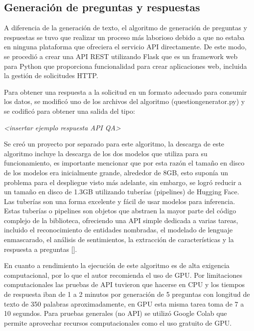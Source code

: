 \documentclass[../Main.tex]{subfiles}
\begin{document}
        \subsection{Generación de preguntas y respuestas}
            \begin{justify}
            A diferencia de la generación de texto, el algoritmo de generación de preguntas y respuestas se tuvo que realizar un proceso más laborioso debido a que no estaba en ninguna plataforma que ofreciera el servicio API directamente. De este modo, se procedió a crear una API REST utilizando Flask que es un framework web para Python que proporciona funcionalidad para crear aplicaciones web, incluida la gestión de solicitudes HTTP.
            
            Para obtener una respuesta a la solicitud en un formato adecuado para consumir los datos, se modificó uno de los archivos del algoritmo (questiongenerator.py) y se codificó para obtener una salida del tipo:
            
            \begin{center}
            \textit{<insertar ejemplo respuesta API QA>}
            \end{center}
            
            Se creó un proyecto por separado para este algoritmo, la descarga de este algoritmo incluye la descarga de los dos modelos que utiliza para su funcionamiento, es importante mencionar que por esta razón el tamaño en disco de los modelos era inicialmente grande, alrededor de 8GB, esto suponía un problema para el despliegue visto más adelante, sin embargo, se logró reducir a un tamaño en disco de 1.3GB utilizando tuberías (pipelines) de Hugging Face. Las tuberías son una forma excelente y fácil de usar modelos para inferencia. Estas tuberías o pipelines son objetos que abstraen la mayor parte del código complejo de la biblioteca, ofreciendo una API simple dedicada a varias tareas, incluido el reconocimiento de entidades nombradas, el modelado de lenguaje enmascarado, el análisis de sentimientos, la extracción de características y la respuesta a preguntas []. %
            \end{justify}
            
            \begin{justify}
            En cuanto a rendimiento la ejecución de este algoritmo es de alta exigencia computacional, por lo que el autor recomienda el uso de GPU. Por limitaciones computacionales las pruebas de API tuvieron que hacerse en CPU y los tiempos de respuesta iban de 1 a 2 minutos por generación de 5 preguntas con longitud de texto de 350 palabras aproximadamente, en GPU esta misma tarea toma de 7 a 10 segundos. Para pruebas generales (no API) se utilizó Google Colab que permite aprovechar recursos computacionales como el uso gratuito de GPU.
            \end{justify}
            
\end{document}
